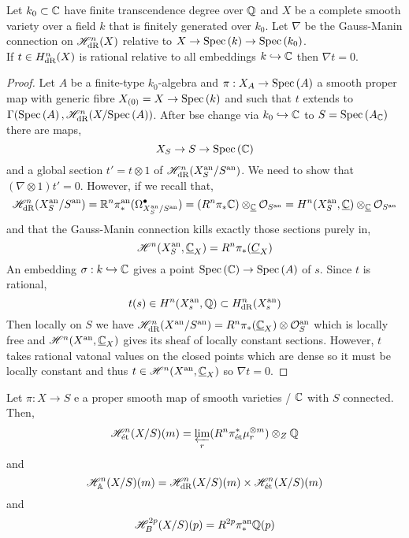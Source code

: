 \documentclass[12pt]{article}
\begin{document}
\newcommand{\fin}{\mathrm{fin}}

\begin{proposition}
Let $k_0 \subset \mathbb{C}$ have finite transcendence degree over $\mathbb{Q}$ and $X$ be a complete smooth variety over a field $k$ that is finitely generated over $k_0$. Let $\nabla$ be the Gauss-Manin connection on $\mathscr{H}^n_{\mathrm{dR}}(X)$ relative to $X \to \mathrm{Spec}\left( k \right) \to \mathrm{Spec}\left( k_0 \right)$.
\bigskip\\
If $t \in H^n_{\mathrm{dR}}(X)$ is rational relative to all embeddings $k \hookrightarrow  \mathbb{C}$ then $\nabla t = 0$. 
\end{proposition}

\begin{proof}
Let $A$ be a finite-type $k_0$-algebra and $\pi : X_A \to \mathrm{Spec}\left( A \right)$ a smooth proper map with generic fibre $X_{(0)} = X \to \mathrm{Spec}\left( k \right)$ and such that $t$ extends to $\Gamma(\mathrm{Spec}\left( A \right), \mathscr{H}^n_{\mathrm{dR}}(X / \mathrm{Spec}\left( A \right))$. After bse change via $k_0 \hookrightarrow \mathbb{C}$ to $S = \mathrm{Spec}\left( A_{\mathbb{C}} \right)$ there are maps,
\[ X_S \to S \to \mathrm{Spec}\left( \mathbb{C} \right) \]
and a global section $t' = t \otimes 1$ of $\mathscr{H}^n_{\mathrm{dR}}(X_S^{\mathrm{an}} / S^{\mathrm{an}})$. We need to show that $(\nabla \otimes 1) t' = 0$. However, if we recall that,
\[ \mathscr{H}^n_{\mathrm{dR}}(X_S^{\mathrm{an}} / S^{\mathrm{an}}) = \mathbb{R}^n \pi_*^{\mathrm{an}} (\Omega^\bullet_{X_S^{\mathrm{an}} / S^{\mathrm{an}}}) = (R^n \pi_* \mathbb{C}) \otimes_{\underline{\mathbb{C}}} \mathcal{O}_{S^{\mathrm{an}}} = H^n(X^{\mathrm{an}}_S, \underline{\mathbb{C}}) \otimes_{\underline{\mathbb{C}}} \mathcal{O}_{S^{\mathrm{an}}} \]
and that the Gauss-Manin connection kills exactly those sections purely in,
\[ \mathscr{H}^n(X^{\mathrm{an}}_S, \underline{\mathbb{C}}_X) = R^n \pi_* (\underline{C}_X) \]
An embedding $\sigma : k \hookrightarrow \mathbb{C}$ gives a point $\mathrm{Spec}\left( \mathbb{C} \right) \to \mathrm{Spec}\left( A \right)$ of $s$. Since $t$ is rational,
\[ t(s) \in H^n(X^{\mathrm{an}}_s, \mathbb{Q}) \subset H^n_{\mathrm{dR}}(X^{\mathrm{an}}_s) \]
Then locally on $S$ we have $\mathscr{H}^n_{\mathrm{dR}}(X^{\mathrm{an}} / S^{\mathrm{an}}) = R^n \pi_*(\underline{\mathbb{C}}_X) \otimes \mathcal{O}_{S}^{\mathrm{an}}$ which is locally free and $\mathscr{H}^n(X^{\mathrm{an}}, \underline{\mathbb{C}}_X)$ gives its sheaf of locally constant sections. However, $t$ takes rational vatonal values on the closed points which are dense so it must be locally constant and thus $t \in \mathscr{H}^n(X^{\mathrm{an}}, \underline{\mathbb{C}}_X)$ so $\nabla t = 0$.
\end{proof}

\begin{definition}
Let $\pi : X \to S$ e a proper smooth map of smooth varieties / $\mathbb{C}$ with $S$ connected. Then,
\[ \mathscr{H}^n_{\text{\'{e}t}}(X/S)(m) = \varprojlim_r (R^n \pi^*_{\text{\'{e}t}} \mu_r^{\otimes m} ) \otimes_Z \mathbb{Q} \]
and
\[ \mathscr{H}^n_{\mathbb{A}}(X/S)(m) = \mathscr{H}^n_{\mathrm{dR}}(X/S)(m) \times \mathscr{H}^n_{\text{\'{e}t}}(X/S)(m) \]
and
\[ \mathscr{H}_B^{2 p}(X/S)(p) = R^{2p} \pi_*^{\mathrm{an}} \mathbb{Q}(p) \]
\end{definition}
\end{document}
